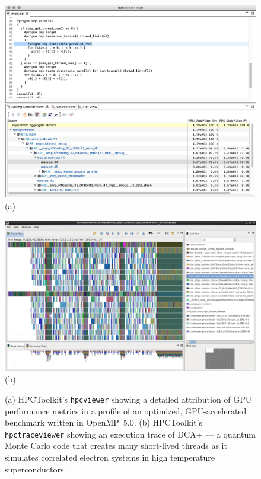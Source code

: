 \begin{figure}[t]
\captionsetup{width=.96\textwidth}
\begin{minipage}[t]{.48\textwidth}
\centering
\includegraphics[width=\textwidth]{projects/2.3.2-Tools/2.3.2.08-HPCToolkit/hpctoolkit-vec-add-ompt}
\\(a)
\end{minipage}
\hfill
\begin{minipage}[t]{.48\textwidth}
\centering
\includegraphics[width=\textwidth]{projects/2.3.2-Tools/2.3.2.08-HPCToolkit/hpctoolkit-many-threads}
\\(b)
\end{minipage}
\caption{(a) 
HPCToolkit's {\tt hpcviewer} showing a detailed attribution of GPU performance metrics in a 
profile of an optimized, GPU-accelerated benchmark written in 
OpenMP~5.0.
(b) HPCToolkit's {\tt hpctraceviewer} showing an execution trace of DCA+ --- a quantum Monte Carlo code that
creates many short-lived threads as it simulates correlated electron
systems in high temperature superconductors.}
\label{fig:hpctoolkit}
\end{figure}

